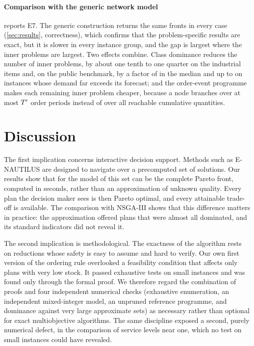 \documentclass[preprint,12pt,authoryear]{elsarticle}
\newcommand{\tabin}[1]{\IfFileExists{tables/#1}{}{\fbox{run make\_figures.py: #1}}}
\begin{document}
\paragraph{Comparison with the generic network model}
 reports E7. The generic construction returns the same fronts in every case
(\cref{sec:results}, correctness), which confirms that the problem-specific results are
exact, but it is slower in every instance group, and the gap is largest where the inner
problems are largest. Two effects combine. Class dominance reduces the number of inner
problems, by about one tenth to one quarter on the industrial items and, on the public
benchmark, by a factor of \EsixClassRedMed{} in the median and up to \EsixClassRedMax{} on
instances whose demand far exceeds its forecast; and the
order-event programme makes each remaining inner problem cheaper, because a node branches
over at most $T'$ order periods instead of over all reachable cumulative quantities.

\begin{table}[t]
  \centering
  \caption{Generic network model (period-by-period programme over all classes, no
  problem-specific reductions) against the algorithm of this paper (E7): mean number of
  inner problems solved and mean time per instance, nine threads, same machine. Speed-up
  is the mean of the per-instance ratios.}
  \label{tab:e7}
  \small
  \tabin{tab_e7.tex}
\end{table}

\section{Discussion}\label{sec:discussion}

The first implication concerns interactive decision support. Methods such as E-NAUTILUS
are designed to navigate over a precomputed set of solutions. Our results show that for
the model of \citet{Kania2022CIE} this set can be the complete Pareto front, computed in
seconds, rather than an approximation of unknown quality. Every plan the decision maker
sees is then Pareto optimal, and every attainable trade-off is available. The
comparison with NSGA-III shows that this difference matters in practice: the
approximation offered plans that were almost all dominated, and its standard indicators
did not reveal it.

The second implication is methodological. The exactness of the algorithm rests on
reductions whose safety is easy to assume and hard to verify. Our own first version of the
ordering rule overlooked a feasibility condition that affects only plans with very low
stock. It passed exhaustive tests on small instances and was found only through the
formal proof. We therefore regard the combination of proofs and four independent numerical checks
(exhaustive enumeration, an independent mixed-integer model, an unpruned reference
programme, and dominance against very large approximate sets) as necessary rather than
optional for exact multiobjective algorithms. The same discipline exposed a second, purely
numerical defect, in the comparison of service levels near one, which no test on small
instances could have revealed.
\end{document}
